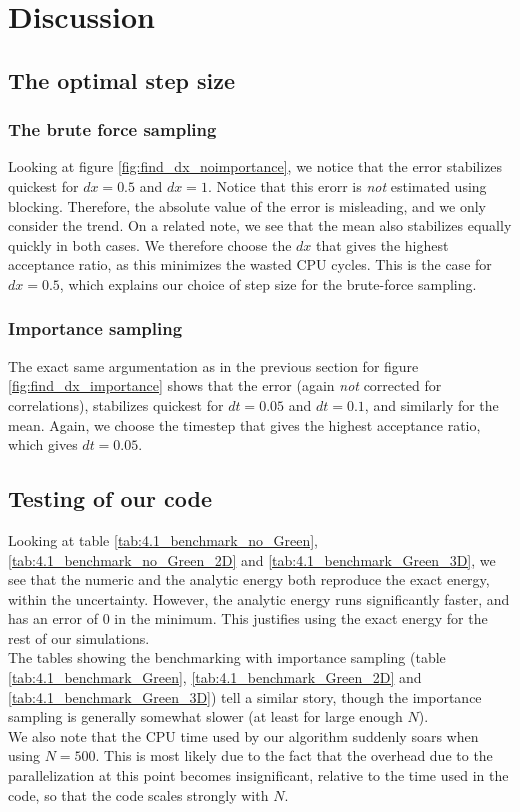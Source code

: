 \documentclass[a4paper, 10pt]{article}
\begin{document}
	\section{Discussion}
	\subsection{The optimal step size}
	\subsubsection{The brute force sampling}\label{sec:Disc_optimal_step_size_brute_force}
	Looking at figure \ref{fig:find_dx_noimportance}, we notice that the error stabilizes quickest for $dx=0.5$ and $dx=1$. Notice that this erorr is \textit{not} estimated using blocking. Therefore, the absolute value of the error is misleading, and we only consider the trend. On a related note, we see that the mean also stabilizes equally quickly in both cases. We therefore choose the $dx$ that gives the highest acceptance ratio, as this minimizes the wasted CPU cycles. This is the case for $dx=0.5$, which explains our choice of step size for the brute-force sampling.
	\subsubsection{Importance sampling}\label{sec:Disc_importance_sampling_step_size}
	The exact same argumentation as in the previous section for figure \ref{fig:find_dx_importance} shows that the error (again \textit{not} corrected for correlations), stabilizes quickest for $dt=0.05$ and $dt=0.1$, and similarly for the mean. Again, we choose the timestep that gives the highest acceptance ratio, which gives $dt=0.05$.
	\subsection{Testing of our code}\label{sec:Desc_testing_code}
	Looking at table \ref{tab:4.1_benchmark_no_Green}, \ref{tab:4.1_benchmark_no_Green_2D} and \ref{tab:4.1_benchmark_Green_3D}, we see that the numeric and the analytic energy both reproduce the exact energy, within the uncertainty.  However, the analytic energy runs significantly faster, and has an error of $0$ in the minimum. This justifies using the exact energy for the rest of our simulations.\\
	\linebreak
	The tables showing the benchmarking with importance sampling (table \ref{tab:4.1_benchmark_Green}, \ref{tab:4.1_benchmark_Green_2D} and \ref{tab:4.1_benchmark_Green_3D}) tell a similar story, though the importance sampling is generally somewhat slower (at least for large enough $N$).\\
	\linebreak
	We also note that the CPU time used by our algorithm suddenly soars when using $N=500$. This is most likely due to the fact that the overhead due to the parallelization at this point becomes insignificant, relative to the time used in the code, so that the code scales strongly with $N$.
\end{document}
